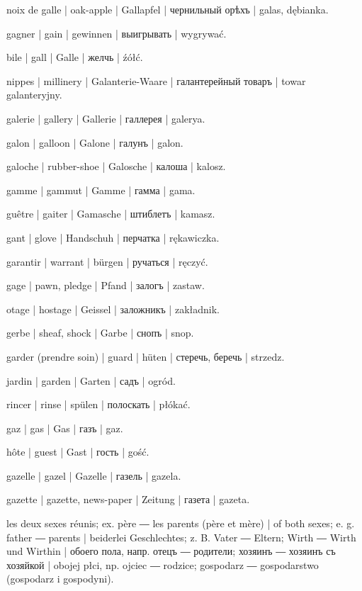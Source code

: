 \begin{outdent}{1em}
noix de galle | oak-apple | Gallapfel | чернильный орѣхъ | galas, dębianka.

gagner | gain | gewinnen | выигрывать | wygrywać.

bile | gall | Galle | желчь | źółć.

nippes | millinery | Galanterie-Waare | галантерейный
товаръ | towar galanteryjny.

galerie | gallery | Gallerie | галлерея | galerya.

galon | galloon | Galone | галунъ | galon.

galoche | rubber-shoe | Galosche | калоша | kalosz.

gamme | gammut | Gamme | гамма | gama.

guêtre | gaiter | Gamasche | штиблетъ | kamasz.

gant | glove | Handschuh | перчатка | rękawiczka.

garantir | warrant | bürgen | ручаться | ręczyć.

\uvsubentry{}
gage | pawn, pledge | Pfand | залогъ | zastaw.


\uvsubentry{}
otage | hostage | Geissel | заложникъ | zakładnik.

gerbe | sheaf, shock | Garbe | снопъ | snop.

garder (prendre soin) | guard | hüten | стеречь, беречь | strzedz.

jardin | garden | Garten | садъ | ogród.

rincer | rinse | spülen | полоскать | płókać.

gaz | gas | Gas | газъ | gaz.

hôte | guest | Gast | гость | gość.

gazelle | gazel | Gazelle | газель | gazela.

gazette | gazette, news-paper | Zeitung | газета | gazeta.

les deux sexes réunis; ex.  père ―  les
parents (père et mère) | of both sexes; e. g.  father ―
 parents | beiderlei Geschlechtes; z. B.  Vater
―  Eltern;  Wirth ―  Wirth und
Wirthin | обоего пола, напр.  отецъ ―  родители;
 хозяинъ ―  хозяинъ съ хозяйкой | obojej
płci, np.  ojciec ―  rodzice;  gospodarz
―  gospodarstwo (gospodarz i gospodyni).


\end{outdent}

